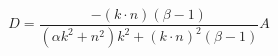 \begin{equation}
D=\frac{-(k\cdot n)(\beta -1)}{(\alpha k^{2}+n^{2})k^{2}+(k\cdot
n)^{2}(\beta -1)}A  \label{15}
\end{equation}

